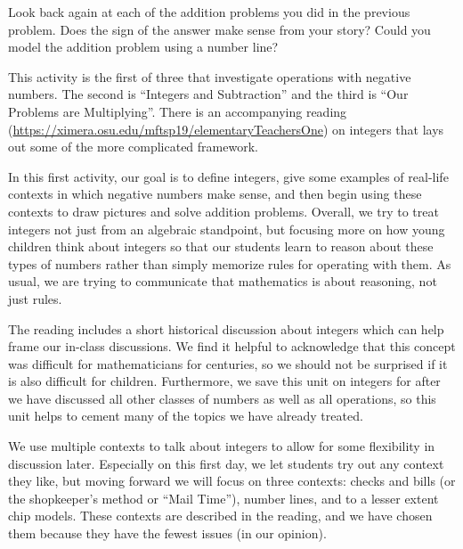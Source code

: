 \documentclass[nooutcomes]{ximera}
\begin{document}
\begin{problem}
Look back again at each of the addition problems you did in the previous problem.  Does the sign of the answer make sense from your story?  Could you model the addition problem using a number line?

\end{problem}


\newpage
\begin{instructorNotes}
This activity is the first of three that investigate operations with negative numbers.  The second is ``Integers and Subtraction'' and the third is ``Our Problems are Multiplying''.  There is an accompanying reading (\url{https://ximera.osu.edu/mftsp19/elementaryTeachersOne}) on integers that lays out some of the more complicated framework.

In this first activity, our goal is to define integers, give some examples of real-life contexts in which negative numbers make sense, and then begin using these contexts to draw pictures and solve addition problems.  Overall, we try to treat integers not just from an algebraic standpoint, but focusing more on how young children think about integers so that our students learn to reason about these types of numbers rather than simply memorize rules for operating with them.  As usual, we are trying to communicate that mathematics is about reasoning, not just rules.

The reading includes a short historical discussion about integers which can help frame our in-class discussions.  We find it helpful to acknowledge that this concept was difficult for mathematicians for centuries, so we should not be surprised if it is also difficult for children.  Furthermore, we save this unit on integers for after we have discussed all other classes of numbers as well as all operations, so this unit helps to cement many of the topics we have already treated.

We use multiple contexts to talk about integers to allow for some flexibility in discussion later.  Especially on this first day, we let students try out any context they like, but moving forward we will focus on three contexts: checks and bills (or the shopkeeper's method or ``Mail Time''), number lines, and to a lesser extent chip models.  These contexts are described in the reading, and we have chosen them because they have the fewest issues (in our opinion).


\end{instructorNotes}
\end{document}
